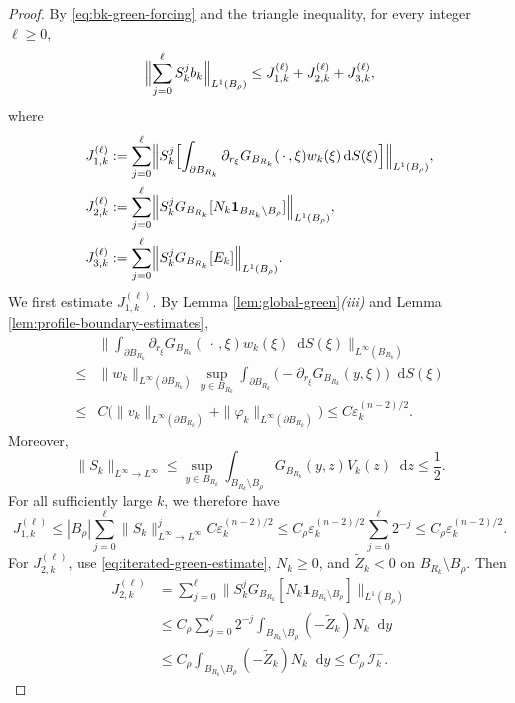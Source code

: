 \documentclass[10pt,a4paper]{amsart}
\newcommand{\dd}{\mathop{}\!\mathrm{d}}
\theoremstyle{plain}
\theoremstyle{remark}
\begin{document}
\begin{proof}
 By \eqref{eq:bk-green-forcing} and the triangle inequality, for every
integer $\ell\ge0$,
{
\[
 \Bigl\|\sum_{j=0}^{\ell}S_k^jb_k\Bigr\|_{L^1(B_\rho)}
 \le J_{1,k}^{(\ell)}+J_{2,k}^{(\ell)}+J_{3,k}^{(\ell)},
\]
}
where
{
\[
\begin{aligned}
 J_{1,k}^{(\ell)}
 &:=\sum_{j=0}^{\ell}
 \Bigl\|S_k^j\Bigl[
 \int_{\partial B_{R_k}}
 \partial_{r_\xi}G_{B_{R_k}}(\,\cdot\,,\xi)
 w_k(\xi)\dd S(\xi)\Bigr]\Bigr\|_{L^1(B_\rho)},\\
 J_{2,k}^{(\ell)}
 &:=\sum_{j=0}^{\ell}
 \Bigl\|S_k^jG_{B_{R_k}}
 [N_k\mathbf 1_{B_{R_k}\setminus B_\rho}]
 \Bigr\|_{L^1(B_\rho)},\\
 J_{3,k}^{(\ell)}
 &:=\sum_{j=0}^{\ell}
 \Bigl\|S_k^jG_{B_{R_k}}[E_k]
 \Bigr\|_{L^1(B_\rho)}.
\end{aligned}
\]
}
 We first estimate $J_{1,k}^{(\ell)}$.  By
Lemma  \ref{lem:global-green}\emph{(iii)} and
Lemma  \ref{lem:profile-boundary-estimates},
{
\[
\begin{aligned}
 &\bigg\|\int_{\partial B_{R_k}}
 \partial_{r_\xi}G_{B_{R_k}}(\,\cdot\,,\xi)w_k(\xi)\dd S(\xi)
 \bigg\|_{L^\infty(B_{R_k})}\\
 {}\le{}&
 \|w_k\|_{L^\infty(\partial B_{R_k})}
 \sup_{y\in B_{R_k}}
 \int_{\partial B_{R_k}}
 \bigl(-\partial_{r_\xi}G_{B_{R_k}}(y,\xi)\bigr)\dd S(\xi)\\
 {}\le{}&C\bigl(
 \|v_k\|_{L^\infty(\partial B_{R_k})}
 +\|\varphi_k\|_{L^\infty(\partial B_{R_k})}\bigr)
 \le C\varepsilon_k^{(n-2)/2}.
\end{aligned}
\]
}
 Moreover,
{
\[
 \|S_k\|_{L^\infty\to L^\infty}
 \le\sup_{y\in B_{R_k}}
 \int_{B_{R_k}\setminus B_\rho}
 G_{B_{R_k}}(y,z)V_k(z)\dd z
 \le\frac12.
\]
}
 For all sufficiently large $k$, we therefore have
{
\[
 J_{1,k}^{(\ell)}
 \le |B_\rho|\sum_{j=0}^{\ell}
 \|S_k\|_{L^\infty\to L^\infty}^j
 C\varepsilon_k^{(n-2)/2}
 \le C_\rho\varepsilon_k^{(n-2)/2}
 \sum_{j=0}^{\ell}2^{-j}\le C_\rho\varepsilon_k^{(n-2)/2}.
\]
}
For  $J_{2,k}^{(\ell)}$, use \eqref{eq:iterated-green-estimate},
$N_k\ge0$, and $\widetilde Z_k<0$ on
$B_{R_k}\setminus B_\rho$.  Then
{
\[
\begin{aligned}
 J_{2,k}^{(\ell)}
 &=\sum_{j=0}^{\ell}
 \Big\|S_k^jG_{B_{R_k}}
 [N_k\mathbf 1_{B_{R_k}\setminus B_\rho}]
 \Big\|_{L^1(B_\rho)}\\
 &\le C_\rho\sum_{j=0}^{\ell}2^{-j}
 \int_{B_{R_k}\setminus B_\rho}(-\widetilde Z_k)N_k\dd y\\
 &\le C_\rho
 \int_{B_{R_k}\setminus B_\rho}(-\widetilde Z_k)N_k\dd y
 \le C_\rho\,\mathcal I_k^-.
\end{aligned}
\]}
\end{proof}
\end{document}
